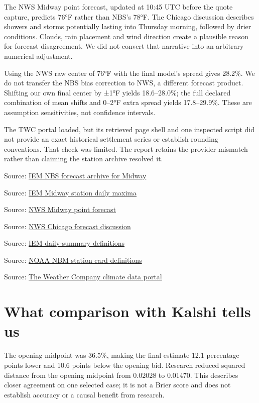 \documentclass[11pt]{article}
\begin{document}
The NWS Midway point forecast, updated at 10:45 UTC before the quote capture, predicts 76°F rather than NBS’s 78°F. The Chicago discussion describes showers and storms potentially lasting into Thursday morning, followed by drier conditions. Clouds, rain placement and wind direction create a plausible reason for forecast disagreement. We did not convert that narrative into an arbitrary numerical adjustment.


Using the NWS raw center of 76°F with the final model’s spread gives 28.2\%. We do not transfer the NBS bias correction to NWS, a different forecast product. Shifting our own final center by ±1°F yields 18.6–28.0\%; the full declared combination of mean shifts and 0–2°F extra spread yields 17.8–29.9\%. These are assumption sensitivities, not confidence intervals.


The TWC portal loaded, but its retrieved page shell and one inspected script did not provide an exact historical settlement series or establish rounding conventions. That check was limited. The report retains the provider mismatch rather than claiming the station archive resolved it.


\par{\small Source: \href{https://mesonet.agron.iastate.edu/cgi-bin/request/mos.py?station=KMDW\&model=NBS\&sts=2026-07-17T00\%3A00Z\&ets=2026-09-15T00\%3A00Z\&format=csv}{IEM NBS forecast archive for Midway}}
\par{\small Source: \href{https://mesonet.agron.iastate.edu/cgi-bin/request/daily.py?sts=2026-07-18\&ets=2026-09-15\&network=IL\_ASOS\&stations=MDW\&var=max\_temp\_f\&format=csv}{IEM Midway station daily maxima}}
\par{\small Source: \href{https://api.weather.gov/gridpoints/LOT/72,69/forecast}{NWS Midway point forecast}}
\par{\small Source: \href{https://forecast.weather.gov/product.php?site=LOT\&issuedby=LOT\&product=AFD\&format=TXT\&version=1\&glossary=0}{NWS Chicago forecast discussion}}
\par{\small Source: \href{https://mesonet.agron.iastate.edu/cgi-bin/request/daily.py?help=}{IEM daily-summary definitions}}
\par{\small Source: \href{https://vlab.noaa.gov/web/mdl/nbm-textcard-v5.0}{NOAA NBM station card definitions}}
\par{\small Source: \href{https://weather.com/kalshi}{The Weather Company climate data portal}}
\section*{\textcolor{epdarkgreen}{What comparison with Kalshi tells us}}
The opening midpoint was 36.5\%, making the final estimate 12.1 percentage points lower and 10.6 points below the opening bid. Research reduced squared distance from the opening midpoint from 0.02028 to 0.01470. This describes closer agreement on one selected case; it is not a Brier score and does not establish accuracy or a causal benefit from research.
\end{document}
